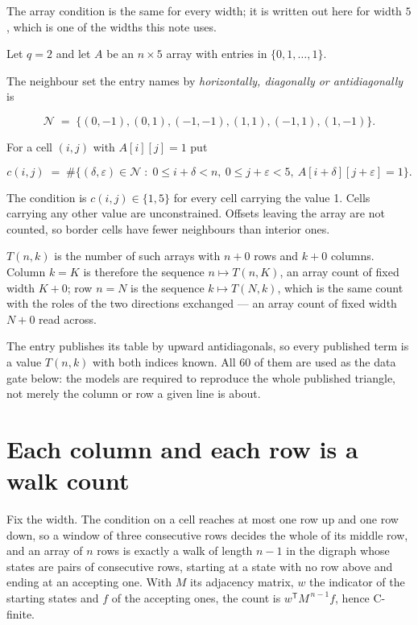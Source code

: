 \documentclass[11pt]{article}
\theoremstyle{definition}
\begin{document}
The array condition is the same for every width; it is written out here for width $5$, which is one of the widths this note uses.

Let $q = 2$ and let $A$ be an $n \times 5$ array with entries in $\{0,1,\dots,1\}$.

The neighbour set the entry names by {\itshape horizontally, diagonally or antidiagonally} is

\[\mathcal{N} \;=\; \{(0,-1), (0,1), (-1,-1), (1,1), (-1,1), (1,-1)\}.\]

For a cell $(i,j)$ with $A[i][j] = 1$ put

\[c(i,j) \;=\; \#\bigl\{(\delta,\varepsilon)\in\mathcal{N} \;:\; 0\le i+\delta<n,\ 0\le j+\varepsilon<5,\ A[i+\delta][j+\varepsilon] = 1\bigr\}.\]

The condition is $c(i,j) \in \{1, 5\}$ for every cell carrying the value 1. Cells carrying any other value are unconstrained. Offsets leaving the array are not counted, so border cells have fewer neighbours than interior ones.

$T(n,k)$ is the number of such arrays with $n + 0$ rows and $k + 0$ columns. Column $k = K$ is therefore the sequence $n \mapsto T(n,K)$, an array count of fixed width $K + 0$; row $n = N$ is the sequence $k \mapsto T(N,k)$, which is the same count with the roles of the two directions exchanged --- an array count of fixed width $N + 0$ read across.

The entry publishes its table by upward antidiagonals, so every published term is a value $T(n,k)$ with both indices known. All 60 of them are used as the data gate below: the models are required to reproduce the whole published triangle, not merely the column or row a given line is about.

\section{Each column and each row is a walk count}

Fix the width. The condition on a cell reaches at most one row up and one row down, so a window of three consecutive rows decides the whole of its middle row, and an array of $n$ rows is exactly a walk of length $n-1$ in the digraph whose states are pairs of consecutive rows, starting at a state with no row above and ending at an accepting one. With $M$ its adjacency matrix, $w$ the indicator of the starting states and $f$ of the accepting ones, the count is $w^{\mathsf T}M^{\,n-1}f$, hence C-finite.
\end{document}
